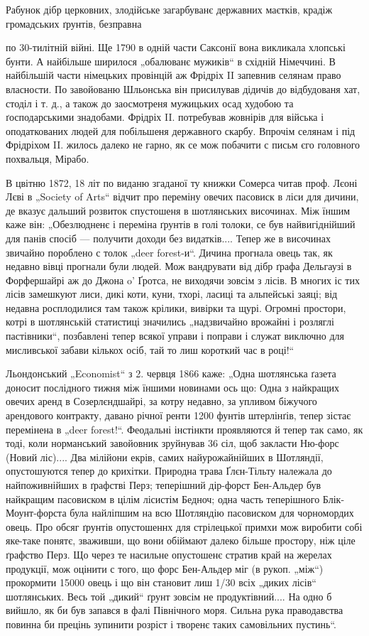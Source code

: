 Рабунок дібр церковних, злодійське загарбуванє державних маєтків, крадіж громадських ґрунтів, безправна

по 30-тилітній війні. Ще 1790 в одній части Саксонії вона викликала хлопські бунти. А найбільше ширилося „обалюванє мужиків“ в східній Німеччині. В найбільшій части німецьких провінцій аж Фрідріх II запевнив селянам право власности. По завойованю Шльонська він присилував дідичів до відбудованя хат, стоділ і т. д., а також до заосмотреня мужицьких осад худобою та ґосподарськими знадобами. Фрідріх II. потребував жовнірів для війська і оподаткованих людей для побільшеня державного
скарбу. Впрочім селянам і під Фрідріхом II. жилось далеко не гарно, як се мож побачити с письм єго головного похвальця, Мірабо.

В цвітню 1872, 18 літ по виданю згаданої ту книжки Сомерса читав проф. Лєоні Лєві в „Society of Arts“ відчит про переміну овечих пасовиск в ліси для дичини, де вказує дальший розвиток спустошеня в шотлянських височинах. Між їншим каже він: „Обезлюдненє і переміна ґрунтів в голі толоки, се був найвигіднійший для панів спосіб — получити доходи без видатків.... Тепер же в височинах звичайно пороблено с толок
„deer forest-и“. Дичина прогнала овець так, як недавно вівці прогнали були людей. Мож вандрувати від дібр ґрафа Дельгаузі в Форфершайрі аж до Джона o' Ґротса, не виходячи зовсім з лісів. В многих іс тих лісів замешкуют лиси, дикі коти, куни, тхорі, ласиці та альпейські заяці; від недавна росплодилися там також крілики, вивірки та щурі. Огромні простори, котрі в шотлянській статистиці значились „надзвичайно врожайні
і розляглі пастівники“, позбавлені тепер всякої управи і поправи і служат виключно для мисливської забави кількох осіб, тай то лиш короткий час в році!“

Льондонський „Economist“ з 2. червця 1866 каже: „Одна шотлянська ґазета доносит послідного тижня між їншими новинами ось що: Одна з найкращих овечих аренд в Созерлєндшайрі, за котру недавно, за упливом біжучого арендового контракту, давано річної ренти 1200 фунтів штерлінґів, тепер зістає перемінена в „deer forest!“. Феодальні інстінкти проявляются й тепер так само, як тоді, коли норманський завойовник зруйнував 36 сіл, щоб закласти Ню-форс (Новий ліс).... Два мілійони екрів, самих найурожайнійших в Шотляндії, опустошуются тепер до крихітки. Природна трава Ґлєн-Тільту належала до найпоживнійших в ґрафстві Перз; теперішний дір-форст Бен-Альдер був найкращим пасовиском в цілім лісистім Бедноч; одна часть теперішного Блік-Моунт-форста була найліпшим на всю Шотляндію пасовиском для чорномордих овець. Про обсяг ґрунтів опустошеннх для стрілецької примхи мож виробити собі яке-таке понятє, зваживши, що вони обіймают далеко більше простору, ніж ціле ґрафство Перз. Що через те насильне опустошенє стратив край на жерелах продукції, мож оцінити с того, що форс Бен-Альдер міг (в рукоп. „між“) прокормити 15000 овець і що він становит лиш 1/30 всіх „диких лісів“ шотлянських. Весь той „дикий“ ґрунт зовсім не продуктівний.... На одно б вийшло, як би був запався в фалі Північного моря. Сильна рука праводавства повинна би прецінь зупинити розріст і творенє таких самовільних
пустинь“.
